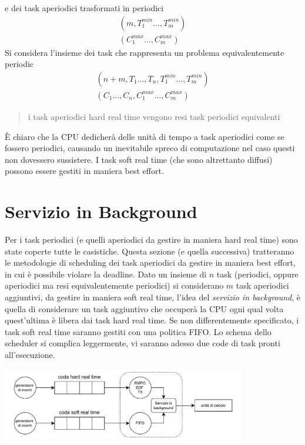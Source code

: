 \documentclass[10pt, letterpaper]{report}
\begin{document}
e dei task aperiodici trasformati in periodici
$$ \begin{matrix}(m,T_1^{min}\dots ,T_m^{min})\\
    (C_1^{max}\dots ,C_m^{max})
\end{matrix}$$
Si considera l'insieme dei task che rappresenta un problema equivalentemente periodic
$$ \begin{matrix}(n+m,T_1\dots ,T_n,T_1^{min}\dots ,T_m^{min})\\
    (C_1\dots ,C_n,C_1^{max}\dots ,C_m^{max})
\end{matrix}$$
\begin{quote}
    i task aperiodici hard real time vengono resi task periodici equivalenti
\end{quote}
È chiaro che la CPU dedicherà delle unità di tempo a task aperiodici come se fossero periodici, causando 
un inevitabile spreco di computazione nel caso questi non dovessero sussistere.\acc 
I task soft real time (che sono altrettanto diffusi) possono essere gestiti in maniera 
best effort.  \flowerLine 
\section{Servizio in Background}
Per i task periodici (e quelli aperiodici da gestire in maniera hard real time) sono state coperte tutte le casistiche. Questa sezione (e quella successiva) tratteranno le metodologie di scheduling dei task aperiodici da gestire in maniera best effort, in cui è possibile violare la deadline.\acc 
Dato un insieme di $n$ task (periodici, oppure aperiodici ma resi equivalentemente periodici) si considerano $m$ task aperiodici aggiuntivi, da gestire in maniera soft real time, l'idea del \textit{servizio in background}, è quella di considerare un task aggiuntivo che occuperà la CPU ogni qual volta quest'ultima è libera dai task hard real time. Se non differentemente specificato, i task soft real time saranno gestiti con una politica FIFO. Lo schema dello scheduler si complica leggermente, vi saranno adesso due code di task pronti all'esecuzione.
\begin{center}
    \includegraphics[width=0.8\textwidth ]{images/schedulerSRT.pdf}
\end{center}
\end{document}

